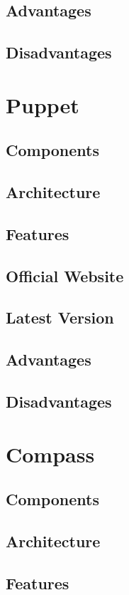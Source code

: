 \documentclass[a4paper, 12pt]{article}
\begin{document}
\subsection{Advantages}
\subsection{Disadvantages}

\newpage
\section{Puppet}
\subsection{Components}
\subsection{Architecture}
\subsection{Features}
\subsection{Official Website}
\subsection{Latest Version}
\subsection{Advantages}
\subsection{Disadvantages}

\newpage
\section{Compass}
\subsection{Components}
\subsection{Architecture}
\subsection{Features}
\end{document}
